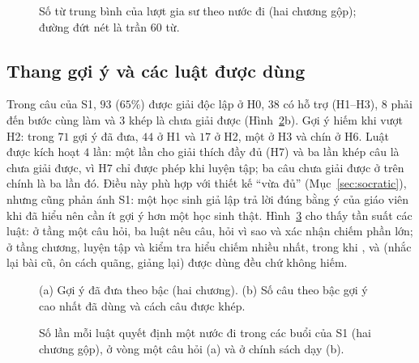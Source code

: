 \begin{table}[tbp]
\centering
\caption{Nguồn của lời gia sư trong các buổi học của S1. ``Câu chung chung'' (\texttt{FALLBACK}) là lượt không có gợi ý đã duyệt hợp bậc, hoặc lời bị lần kiểm cuối chặn hai lần; khi mô hình hỏng, bộ diễn đạt dùng câu mẫu và nguồn ghi là câu mẫu.}
\label{tab:sources}

\end{table}

\begin{figure}[tp]
\centering

\caption{Số từ trung bình của lượt gia sư theo nước đi (hai chương gộp); đường đứt nét là trần $60$ từ.}
\label{fig:messages}
\end{figure}

\subsection{Thang gợi ý và các luật được dùng}
Trong \NItemsResolved{} câu của S1, $93$ ($65\%$) được giải độc lập ở H0, $38$ có hỗ trợ (H1--H3), $8$ phải đến bước cùng làm và $3$ khép là chưa giải được (Hình~\ref{fig:ladder}b). Gợi ý hiếm khi vượt H2: trong $71$ gợi ý đã đưa, $44$ ở H1 và $17$ ở H2, một ở H3 và chín ở H6. Luật  được kích hoạt $4$ lần: một lần cho giải thích đầy đủ (H7) và ba lần khép câu là chưa giải được, vì H7 chỉ được phép khi luyện tập; ba câu chưa giải được ở trên chính là ba lần đó. Điều này phù hợp với thiết kế ``vừa đủ'' (Mục~\ref{sec:socratic}), nhưng cũng phản ánh S1: một học sinh giả lập trả lời đúng bằng ý của giáo viên khi đã hiểu nên cần ít gợi ý hơn một học sinh thật. Hình~\ref{fig:rules} cho thấy tần suất các luật: ở tầng một câu hỏi, ba luật nêu câu, hỏi vì sao và xác nhận chiếm phần lớn; ở tầng chương, luyện tập và kiểm tra hiểu chiếm nhiều nhất, trong khi ,  và  (nhắc lại bài cũ, ôn cách quãng, giảng lại) được dùng đều chứ không hiếm.

\begin{figure}[tp]
\centering

\caption{(a) Gợi ý đã đưa theo bậc (hai chương). (b) Số câu theo bậc gợi ý cao nhất đã dùng và cách câu được khép.}
\label{fig:ladder}
\end{figure}

\begin{figure}[tp]
\centering

\caption{Số lần mỗi luật quyết định một nước đi trong các buổi của S1 (hai chương gộp), ở vòng một câu hỏi (a) và ở chính sách dạy (b).}
\label{fig:rules}
\end{figure}

